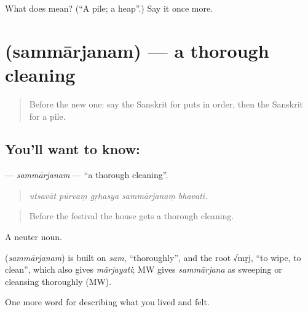 \begin{tcolorbox}[breakable,colback=teal!4,colframe=teal!35!black,title={Before you move on}]
What does  mean? (\textquotedblleft{}A pile; a heap\textquotedblright{}.) Say it once more.
\end{tcolorbox}
\section[\texorpdfstring{\sk{सम्मार्जनम्} (sammārjanam)}{सम्मार्जनम् (sammārjanam)}]{ (sammārjanam) — a thorough cleaning}

\label{lesson:SA-C510-sammarjanam}



\begin{quote}
Before the new one: say the Sanskrit for puts in order, then the Sanskrit for a pile.
\end{quote}

\subsection*{You'll want to know: }
\textbf{} — \emph{sammārjanam} — \textquotedblleft{}a thorough cleaning\textquotedblright{}.

\begin{quote}
    
\end{quote}

\begin{quote}
\emph{utsavāt pūrvaṃ gṛhasya sammārjanaṃ bhavati.}
\end{quote}

\begin{quote}
Before the festival the house gets a thorough cleaning.
\end{quote}

A neuter noun.

\begin{cousinweb}
\textbf{} (\emph{sammārjanam}) is built on \emph{sam}, \textquotedblleft{}thoroughly\textquotedblright{}, and the root √mṛj, \textquotedblleft{}to wipe, to clean\textquotedblright{}, which also gives \emph{mārjayati}; MW gives \emph{sammārjana} as sweeping or cleansing thoroughly (MW).
\end{cousinweb}

\begin{grammarlens}[title={What you've built}]
One more word for describing what you lived and felt.
\end{grammarlens}

